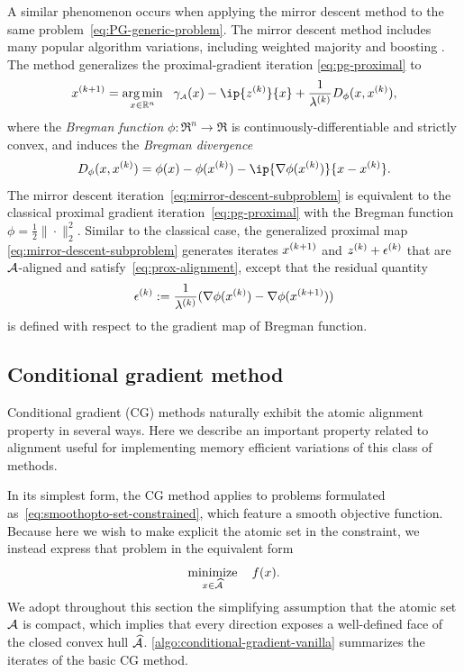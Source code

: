 A similar phenomenon occurs when applying the mirror descent method
\cite{nemirovsky1983problem,beck2003mirror} to the same
problem~\eqref{eq:PG-generic-problem}. The mirror descent method includes many
popular algorithm variations, including weighted majority
\cite{littlestone1994weighted} and boosting \cite{freund1999short}. The method
generalizes the proximal-gradient iteration \eqref{eq:pg-proximal} to
\begin{equation} \label{eq:mirror-descent-subproblem}
  x\kp1 = \argmin{x \in \Re^n} \ \gauge\As(x) - \ip{z\k}{x} + \frac{1}{\lambda\k}D_\phi(x, x\k),  
\end{equation}
where the \emph{Bregman function} $\phi:\Re^n\to\Re$ is
continuously-differentiable and strictly convex, and induces the
\emph{Bregman divergence} 
\[
  D_\phi(x, x\k) = \phi(x) - \phi(x\k) - \ip{\nabla\phi(x\k)}{x - x\k}.
\]
The mirror descent iteration~\eqref{eq:mirror-descent-subproblem} is equivalent
to the classical proximal gradient iteration~\eqref{eq:pg-proximal} with the
Bregman function $\phi = \frac{1}{2}\|\cdot\|_2^2$.  Similar to the classical
case, the generalized proximal map \eqref{eq:mirror-descent-subproblem}
generates iterates $x^{(k+1)}$ and $z^{(k)}+\epsilon^{(k)}$ that are $\mathcal{A}$-aligned and
satisfy~\eqref{eq:prox-alignment}, except that the residual quantity
\[
\epsilon^{(k)} := \frac{1}{\lambda^{(k)}}(\nabla \phi(x^{(k)}) - \nabla \phi(x^{(k+1)}))
\]
is defined with respect to the gradient map of Bregman function.


\subsection{Conditional gradient method}

Conditional gradient (CG) methods
\cite{jaggi2013revisiting,frank1956algorithm,dunn1978conditional} naturally
exhibit the atomic alignment property in several ways. Here we describe an
important property related to alignment useful for implementing memory
efficient variations of this class of methods.

In its simplest form, the CG method applies to problems formulated
as~\eqref{eq:smoothopto-set-constrained}, which feature a smooth objective
function. Because here we wish to make explicit the atomic set in the
constraint, we instead express that problem in the equivalent form 
\begin{equation} \label{eq:CG-generic-problem}
   \displaystyle\mathop{\hbox{\rm minimize}}_{x\in\widehat{\mathcal{A}}}\enspace\enspace f(x).
\end{equation}
We adopt throughout this section the simplifying assumption that the atomic set
$\mathcal{A}$ is compact, which implies that every direction exposes a well-defined
face of the closed convex hull $\widehat{\mathcal{A}}$.
\autoref{algo:conditional-gradient-vanilla} summarizes the iterates of the basic CG
method. 


